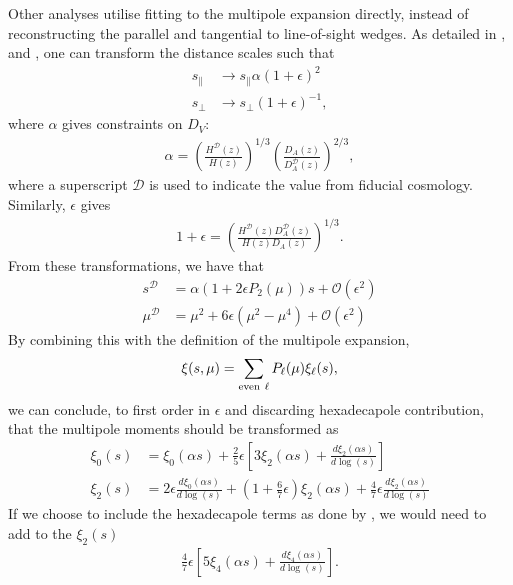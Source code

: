 \documentclass[titlesmallcaps, examinerscopy, copyrightpage]{uqthesis}
\begin{document}
Other analyses utilise fitting to the multipole expansion directly, instead of reconstructing the parallel and tangential to line-of-sight wedges. As detailed in \citet{PadmanabhanWhite2008}, \citet{KazinSanchezBlanton2012} and \citet{XuCuesta2013}, one can transform the distance scales such that
\begin{align}
s_\parallel &\rightarrow s_\parallel \alpha (1 + \epsilon)^2 \\
s_\perp &\rightarrow s_\perp (1 + \epsilon)^{-1},
\end{align}
where $\alpha$ gives constraints on $D_V$:
\begin{align}
\alpha = \left( \frac{H^{\mathcal{D}}(z)}{H(z)}\right) ^{1/3} \left( \frac{D_A(z)}{D_A^{\mathcal{D}}(z)} \right)^{2/3},
\end{align}
where a superscript $\mathcal{D}$ is used to indicate the value from fiducial cosmology. Similarly, $\epsilon$ gives
\begin{align}
1 + \epsilon = \left( \frac{H^{\mathcal{D}}(z) D_A^{\mathcal{D}}(z)}{H(z) D_A(z)} \right) ^{1/3}.
\end{align}
From these transformations, we have that
\begin{align}
s^\mathcal{D} &= \alpha (1 + 2\epsilon P_2(\mu)) s + \mathcal{O}(\epsilon^2) \\
\mu^\mathcal{D} &= \mu^2 + 6 \epsilon (\mu^2 - \mu^4) + \mathcal{O}(\epsilon^2)
\end{align}
By combining this with the definition of the multipole expansion,
\begin{align}
\xi(s, \mu) = \sum\limits_{\rm{even }\ \ell} P_\ell(\mu) \xi_\ell(s),
\end{align}
we can conclude, to first order in $\epsilon$ and discarding hexadecapole contribution, that the multipole moments should be transformed as \citep{KazinSanchezBlanton2012}
\begin{align}
\xi_0(s) &= \xi_0(\alpha s) + \frac{2}{5}\epsilon \left[ 3 \xi_2(\alpha s) + \frac{d \xi_2(\alpha s)}{d \log(s)}\right] \label{eq:ximp}\\
\xi_2(s) &= 2\epsilon \frac{d \xi_0(\alpha s)}{d\log(s)} + \left( 1 + \frac{6}{7}\epsilon\right) \xi_2(\alpha s) + \frac{4}{7} \epsilon \frac{d \xi_2(\alpha s)}{d \log(s)} 
\end{align}
If we choose to include the hexadecapole terms as done by \citet{XuCuesta2013}, we would need to add to the $\xi_2(s)$ 
\begin{align}
\frac{4}{7}\epsilon \left[ 5 \xi_4 (\alpha s) + \frac{d \xi_4(\alpha s)}{d \log(s)} \right].
\end{align}
\end{document}
